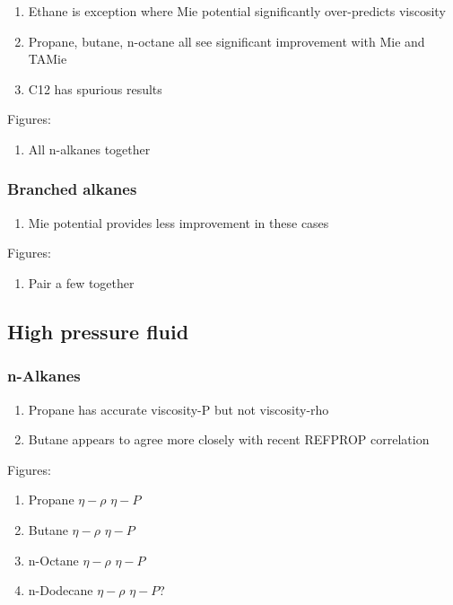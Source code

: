 \documentclass[11pt,a4paper]{article}
\begin{document}
\begin{enumerate}
	\item Ethane is exception where Mie potential significantly over-predicts viscosity
	\item Propane, butane, n-octane all see significant improvement with Mie and TAMie
	\item C12 has spurious results
\end{enumerate}

Figures:

\begin{enumerate}
	\item All n-alkanes together
\end{enumerate}

\subsubsection{Branched alkanes}

\begin{enumerate}
	\item Mie potential provides less improvement in these cases
\end{enumerate}

Figures:

\begin{enumerate}
	\item Pair a few together
\end{enumerate}

\subsection{High pressure fluid}

\subsubsection{n-Alkanes}

\begin{enumerate}
	\item Propane has accurate viscosity-P but not viscosity-rho
	\item Butane appears to agree more closely with recent REFPROP correlation
\end{enumerate}

Figures:

\begin{enumerate}
	\item Propane $\eta-\rho$ $\eta-P$
	\item Butane $\eta-\rho$ $\eta-P$
	\item n-Octane $\eta-\rho$ $\eta-P$
	\item n-Dodecane $\eta-\rho$ $\eta-P$?
\end{enumerate}
\end{document}
